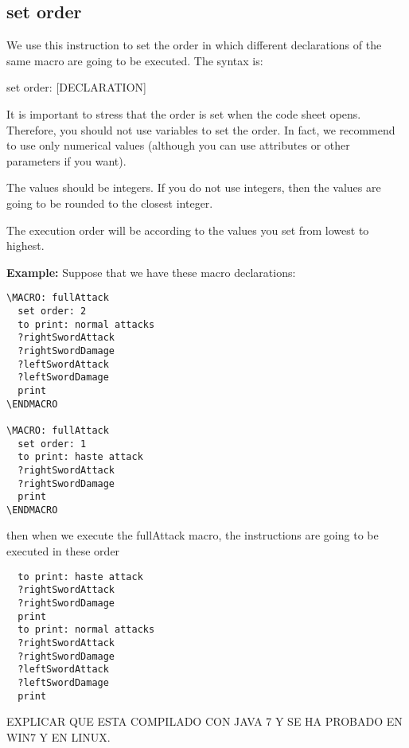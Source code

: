 \documentclass[11pt,a4paper,openright,oneside]{book}
\newenvironment{ex}
{
  \setlength{\parindent}{0cm}
  \large \textbf{Example:} \normalsize 
}
{}
\begin{document}
\subsection{\textsf{set order}}

We use this instruction to set the order in which different declarations of the same macro are going to be executed. The syntax is:
\begin{center} \textsf{set order: \textsc{\scriptsize [DECLARATION]}} \end{center}

It is important to stress that the order is set when the code sheet opens. Therefore, you should not use variables to set the order. In fact, we recommend to use only numerical values (although you can use attributes or other parameters if you want).

The values should be integers. If you do not use integers, then the values are going to be rounded to the closest integer.

The execution order will be according to the values you set from lowest to highest.

\begin{ex} Suppose that we have these macro declarations: 
  \begin{lstlisting}
\MACRO: fullAttack
  set order: 2
  to print: normal attacks
  ?rightSwordAttack
  ?rightSwordDamage
  ?leftSwordAttack
  ?leftSwordDamage
  print
\ENDMACRO

\MACRO: fullAttack
  set order: 1
  to print: haste attack
  ?rightSwordAttack
  ?rightSwordDamage
  print
\ENDMACRO
  \end{lstlisting}  

then when we execute the \textsf{fullAttack} macro, the instructions are going to be executed in these order
\begin{lstlisting}
  to print: haste attack
  ?rightSwordAttack
  ?rightSwordDamage
  print
  to print: normal attacks
  ?rightSwordAttack
  ?rightSwordDamage
  ?leftSwordAttack
  ?leftSwordDamage
  print
\end{lstlisting}

\end{ex}

EXPLICAR QUE ESTA COMPILADO CON JAVA 7 Y SE HA PROBADO EN WIN7 Y EN LINUX.
\end{document}
